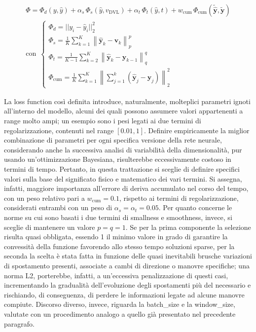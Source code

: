     \begin{equation}
        \begin{aligned}
            \Phi = \Phi_{d}(y, \hat{y}) + \alpha_{s} \, \Phi_{s}(\hat{y}, v_{\text{DVL}}) + \alpha_{t} \, \Phi_{t}(\hat{y}, t) + w_{\text{cum}} \, \Phi_{\text{cum}}(\tilde{\hat{\mathbf{y}}}, \tilde{\mathbf{y}}) \\[0.25cm]
            \text{con} \, \, \, \begin{cases}
                \Phi_{d} = \displaystyle || y_{i} - \hat{y}_{i} ||_{2}^{2} \\[0.35cm]
                \Phi_{s} = \displaystyle \frac{1}{K}\sum_{k=1}^{K}\left\|\hat{\mathbf{y}}_{k}-\mathbf{v}_{k}\right\|_{p}^{p} \\[0.35cm]
                \Phi_{t} = \displaystyle \frac{1}{K-1}\sum_{k=2}^{K}\left\|\hat{\mathbf{y}}_{k}-\hat{\mathbf{y}}_{k-1}\right\|_{q}^{q} \\[0.35cm]
                \Phi_{\text{cum}} = \displaystyle \frac{1}{K}\sum_{k=1}^{K}\left\|\sum_{j=1}^{k}\left(\hat{\mathbf{y}}_{j} - \mathbf{y}_{j}\right)\right\|_{2}^{2}
            \end{cases}
        \end{aligned}
        \label{eq:Lp_norm}
    \end{equation}

La loss function così definita introduce, naturalmente, molteplici parametri ignoti all'interno del modello, alcuni dei quali possono assumere valori appartenenti a range molto ampi; un esempio sono i pesi legati ai due termini di regolarizzazione, contenuti nel range $[0.01, 1]$. Definire empiricamente la miglior combinazione di parametri per ogni specifica versione della rete neurale, considerando anche la successiva analisi di variabilità della dimensionalità, pur usando un'ottimizzazione Bayesiana, risulterebbe eccessivamente costoso in termini di tempo. Pertanto, in questa trattazione si sceglie di definire specifici valori sulla base del significato fisico e matematico dei vari termini. Si assegna, infatti, maggiore importanza all'errore di deriva accumulato nel corso del tempo, con un peso relativo pari a $w_{\text{cum}} = 0.1$, rispetto ai termini di regolarizzazione, considerati entrambi con un peso di $\alpha_{s} = \alpha_{t} = 0.05$. Per quanto concerne le norme su cui sono basati i due termini di smallness e smoothness, invece, si sceglie di mantenere un valore $p = q = 1$. Se per la prima componente la selezione risulta quasi obbligata, essendo 1 il minimo valore in grado di garantire la convessità della funzione favorendo allo stesso tempo soluzioni sparse, per la seconda la scelta è stata fatta in funzione delle quasi inevitabili brusche variazioni di spostamento presenti, associate a cambi di direzione o manovre specifiche; una norma L2, porterebbe, infatti, a un'eccessiva penalizzazione di questi casi, incrementando la gradualità dell'evoluzione degli spostamenti più del necessario e rischiando, di conseguenza, di perdere le informazioni legate ad alcune manovre compiute. Discorso diverso, invece, riguarda la batch\_size e la window\_size, valutate con un procedimento analogo a quello già presentato nel precedente paragrafo. 

